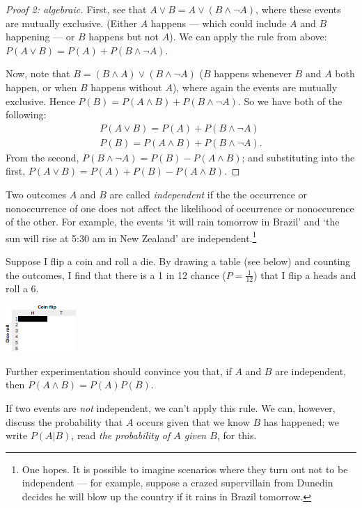 \begin{proof}[Proof 2: algebraic]
  First, see that $ A \vee B = A \vee (B \wedge \neg A) $, where these events are mutually exclusive. (Either $ A $
  happens --- which could include $ A $ and $ B $ happening --- or $ B $ happens but not $ A $). We can apply the rule
  from above: $ P(A \vee B) = P(A) + P(B \wedge \neg A) $.

  Now, note that $ B = (B \wedge A) \vee (B \wedge \neg A) $ ($ B $ happens whenever $ B $ and $ A $ both happen, or
  when $ B $ happens without $ A $), where again the events are mutually exclusive. Hence $ P(B) = P(A \wedge B) + P(B \wedge \neg A) $.
  So we have both of the following:
  \begin{gather*}
    P(A \vee B) = P(A) + P(B \wedge \neg A)\\
    P(B) = P(A \wedge B) + P(B \wedge \neg A).
  \end{gather*}
  From the second, $ P(B \wedge \neg A) = P(B) - P(A \wedge B) $; and substituting into the first, $ P(A \vee B) = P(A) + P(B) - P(A \wedge B) $.
\end{proof}

Two outcomes $ A $ and $ B $ are called \emph{independent} if the the occurrence or nonoccurrence of one
does not affect the likelihood of occurrence or nonoccurence of the other. For example, the events `it will rain tomorrow in Brazil'
and `the sun will rise at 5:30 am in New Zealand' are independent.\footnote{One hopes. It is possible to imagine scenarios where they
turn out not to be independent --- for example, suppose a crazed supervillain from Dunedin decides he will blow up the country if it
rains in Brazil tomorrow.}

Suppose I flip a coin and roll a die. By drawing a table (see below) and counting the outcomes, I find that there
is a 1 in 12 chance ($ P = \frac{1}{12} $) that I flip a heads and roll a 6.

\begin{center}
  \includegraphics[width=0.2\textwidth]{independence}
\end{center}

Further experimentation should convince you that, if $ A $ and $ B $ are independent, then $ P(A \wedge B) = P(A) P(B) $.

If two events are \emph{not} independent, we can't apply this rule. We can, however, discuss the probability that $ A $ occurs
given that we know $ B $ has happened; we write $ P(A | B) $, read \emph{the probability of $ A $ given $ B $}, for this.

